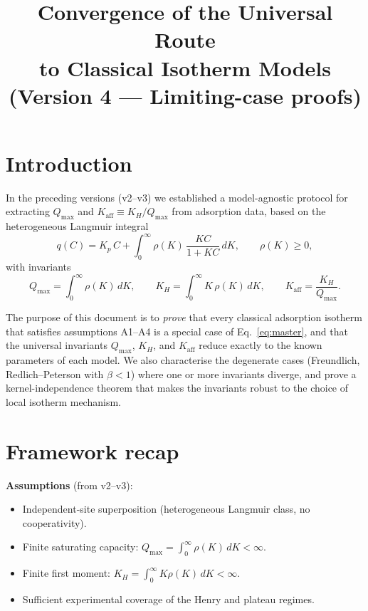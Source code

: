 \documentclass[12pt]{article}
\begin{document}
\title{Convergence of the Universal Route\\
to Classical Isotherm Models\\[6pt]
\large (Version 4 --- Limiting-case proofs)}
\author{}
\date{}
\maketitle

\section{Introduction}

In the preceding versions (v2--v3) we established a model-agnostic
protocol for extracting $Q_{\max}$ and
$K_{\mathrm{aff}}\equiv K_H/Q_{\max}$ from adsorption data, based on
the heterogeneous Langmuir integral
\begin{equation}
  q(C) = K_p\,C + \int_{0}^{\infty} \rho(K)\,\frac{KC}{1+KC}\,dK,
  \qquad \rho(K)\ge 0,
  \label{eq:master}
\end{equation}
with invariants
\begin{equation}
  Q_{\max} = \int_0^\infty \rho(K)\,dK, \qquad
  K_H = \int_0^\infty K\,\rho(K)\,dK, \qquad
  K_{\mathrm{aff}} = \frac{K_H}{Q_{\max}}.
  \label{eq:invariants}
\end{equation}

The purpose of this document is to \emph{prove} that every classical
adsorption isotherm that satisfies assumptions A1--A4 is a special
case of Eq.~\eqref{eq:master}, and that the universal invariants
$Q_{\max}$, $K_H$, and $K_{\mathrm{aff}}$ reduce exactly to the
known parameters of each model.  We also characterise the degenerate
cases (Freundlich, Redlich--Peterson with $\beta<1$) where one or more
invariants diverge, and prove a kernel-independence theorem that makes
the invariants robust to the choice of local isotherm mechanism.

\section{Framework recap}
\label{sec:framework}

\textbf{Assumptions} (from v2--v3):
\begin{itemize}[nosep]
  \item[A1.] Independent-site superposition (heterogeneous Langmuir
        class, no cooperativity).
  \item[A2.] Finite saturating capacity:
        $Q_{\max}=\int_0^\infty\rho(K)\,dK<\infty$.
  \item[A3.] Finite first moment:
        $K_H=\int_0^\infty K\rho(K)\,dK<\infty$.
  \item[A4.] Sufficient experimental coverage of the Henry and plateau
        regimes.
\end{itemize}
\end{document}

